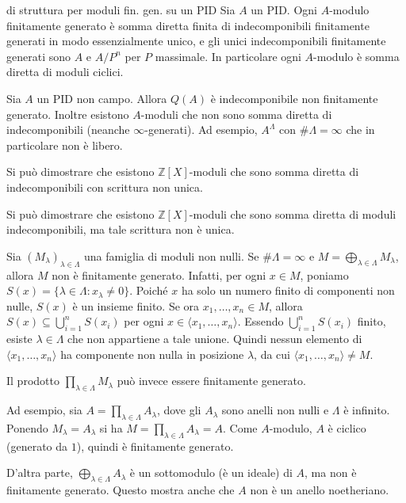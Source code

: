 \begin{theorem}{di struttura per moduli fin. gen. su un PID}
    Sia \(A\) un PID. Ogni \(A\)-modulo finitamente generato è somma diretta
    finita di indecomponibili finitamente generati in modo essenzialmente unico,
    e gli unici indecomponibili finitamente generati sono \(A\) e \(A / P^{n}\)
    per \(P\) massimale. In particolare ogni \(A\)-modulo è somma diretta di
    moduli ciclici.
\end{theorem}

\begin{example}{}
    Sia \(A\) un PID non campo. Allora \(Q{(A)}\) è indecomponibile non
    finitamente generato. Inoltre esistono \(A\)-moduli che non sono somma
    diretta di indecomponibili (neanche \(\infty\)-generati). Ad esempio,
    \(A^{\Lambda}\) con \(\# \Lambda = \infty\) che in particolare non è libero.
\end{example}

\begin{example}{}
    Si può dimostrare che esistono \(\mathbb{Z}[X]\)-moduli che sono somma
    diretta di indecomponibili con scrittura non unica.
\end{example}

\begin{example}
Si può dimostrare che esistono $\mathbb{Z}[X]$-moduli che sono somma diretta di
moduli indecomponibili, ma tale scrittura non è unica.
\end{example}

\begin{remark}
Sia $(M_\lambda)_{\lambda\in\Lambda}$ una famiglia di moduli non nulli.
Se $\#\Lambda=\infty$ e \( M=\bigoplus_{\lambda\in\Lambda} M_\lambda\), 
allora $M$ non è finitamente generato.
Infatti, per ogni $x\in M$, poniamo \( S(x)=\{\lambda\in\Lambda :
x_\lambda\neq0\}\).
Poiché $x$ ha solo un numero finito di componenti non nulle,
$S(x)$ è un insieme finito.
Se ora \( x_1,\dots,x_n\in M\), allora \( S(x)\subseteq \bigcup_{i=1}^n S(x_i)
\) per ogni \( x\in\langle x_1,\dots,x_n\rangle \).
Essendo \( \bigcup_{i=1}^n S(x_i) \)
finito, esiste $\lambda\in\Lambda$ che non appartiene a tale unione.
Quindi nessun elemento di $\langle x_1,\dots,x_n\rangle$ ha componente non nulla
in posizione $\lambda$, da cui \( \langle x_1,\dots,x_n\rangle\neq M \).
\end{remark}

\begin{example}
Il prodotto \( \prod_{\lambda\in\Lambda} M_\lambda \)
può invece essere finitamente generato.

Ad esempio, sia
\( A=\prod_{\lambda\in\Lambda} A_\lambda \), 
dove gli $A_\lambda$ sono anelli non nulli e $\Lambda$ è infinito.
Ponendo \( M_\lambda=A_\lambda\) si ha
\( M=\prod_{\lambda\in\Lambda} A_\lambda=A \).
Come $A$-modulo, $A$ è ciclico (generato da $1$), quindi è finitamente
generato.

D'altra parte,
\( \bigoplus_{\lambda\in\Lambda} A_\lambda \)
è un sottomodulo (è un ideale) di $A$, ma non è finitamente generato.
Questo mostra anche che $A$ non è un anello noetheriano.
\end{example}
